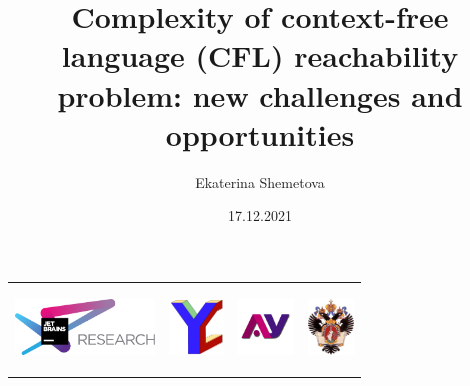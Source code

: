 \documentclass{beamer}
\title[Complexity of CFL-reachability]{Complexity of context-free language (CFL) reachability problem: new challenges and opportunities}
\institute[]{ JetBrains Research, Programming Languages and Tools Lab  \\
    SPBAU, SPBSU }
\author[Ekaterina Shemetova]{Ekaterina Shemetova}
\date{17.12.2021}
\begin{document}
 

{
\begin{frame}[fragile]
  \begin{tabular}{p{2.0cm} p{4.5cm} p{1.5cm} p{1cm}}
   \begin{center}
      \includegraphics[height=1.5cm]{pictures/jetbrainsResearch.pdf}
    \end{center}
    &
    \begin{center}
      \includegraphics[height=1.5cm]{pictures/YC_logo.pdf}
    \end{center}
    &
    \begin{center}
      \includegraphics[height=1.5cm]{pictures/au-logo-full.png}
    \end{center}
    &
    \begin{center}
      \includegraphics[height=1.5cm]{pictures/SPbGU_Logo.png}
    \end{center}
  \end{tabular}
  \titlepage
\end{frame}
}
\end{document}
